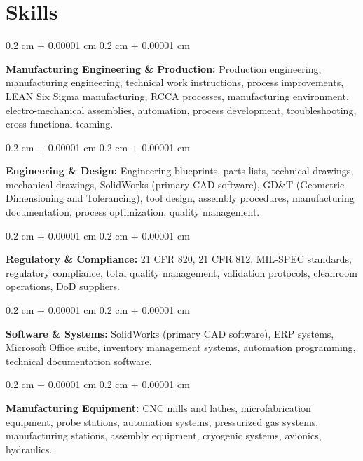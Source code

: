 \documentclass[10pt, letterpaper]{article}
\newenvironment{onecolentry}{
    \begin{adjustwidth}{
        0.2 cm + 0.00001 cm
    }{
        0.2 cm + 0.00001 cm
    }
}{
    \end{adjustwidth}
} %
\begin{document}
\vspace{0.4 cm}


    
    \section{Skills}

        \begin{onecolentry}
            \textbf{Manufacturing Engineering \& Production:} Production engineering, manufacturing engineering, technical work instructions, process improvements, LEAN Six Sigma manufacturing, RCCA processes, manufacturing environment, electro-mechanical assemblies, automation, process development, troubleshooting, cross-functional teaming.
        \end{onecolentry}

        \vspace{0.2 cm}

        \begin{onecolentry}
            \textbf{Engineering \& Design:} Engineering blueprints, parts lists, technical drawings, mechanical drawings, SolidWorks (primary CAD software), GD\&T (Geometric Dimensioning and Tolerancing), tool design, assembly procedures, manufacturing documentation, process optimization, quality management.
        \end{onecolentry}

        \vspace{0.2 cm}

        \begin{onecolentry}
            \textbf{Regulatory \& Compliance:} 21 CFR 820, 21 CFR 812, MIL-SPEC standards, regulatory compliance, total quality management, validation protocols, cleanroom operations, DoD suppliers.
        \end{onecolentry}

        \vspace{0.2 cm}

        \begin{onecolentry}
            \textbf{Software \& Systems:} SolidWorks (primary CAD software), ERP systems, Microsoft Office suite, inventory management systems, automation programming, technical documentation software.
        \end{onecolentry}

        \vspace{0.2 cm}

        \begin{onecolentry}
            \textbf{Manufacturing Equipment:} CNC mills and lathes, microfabrication equipment, probe stations, automation systems, pressurized gas systems, manufacturing stations, assembly equipment, cryogenic systems, avionics, hydraulics.
        \end{onecolentry}
\end{document}
